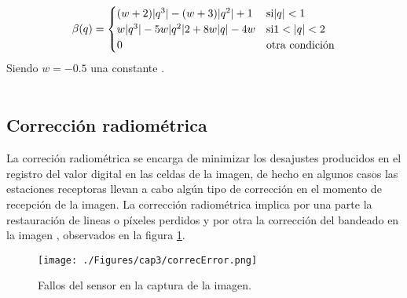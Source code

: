 \begin{itemize}
		    		\begin{equation}\label{ec:interCubica}
		    		\beta(q) = \begin{cases}
		    		(w+2)\abs{q^{3}}-(w+3)\abs{q^{2}}+1 & \text{si} \abs{q} < 1 \\
		    		w\abs{q^{3}}-5w\abs{q^{2}}2+8w\abs{q}-4w & \text{si} 1 < \abs{q} < 2\\
		    		0 & \text{otra condici\'on}
		    		\end{cases}
		    		\end{equation}
		    		Siendo $ w=-0.5 $ una constante \cite{guide1999erdas}.\\~\\

	\end{itemize}
\subsection{Correcci\'on radiom\'etrica}
La correci\'on radiom\'etrica se encarga de minimizar los desajustes producidos en el registro del valor digital en las celdas de la imagen, de hecho en algunos casos las estaciones receptoras llevan a cabo alg\'un tipo de correcci\'on en el momento de recepci\'on de la imagen. La corrección radiom\'etrica implica por una parte la restauraci\'on de lineas o p\'ixeles perdidos y por otra la correcci\'on del bandeado en la imagen \cite{teledUm}, observados en la figura \ref{fig:correcError}.
    \begin{figure}[H]
    	\centering
    	\texttt{[image: ./Figures/cap3/correcError.png]}
    	\caption{Fallos del sensor en la captura de la imagen.}
    	\label{fig:correcError}
    \end{figure}

